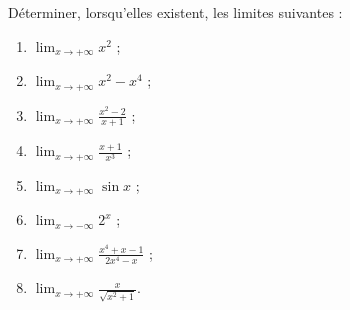 \begin{exercice}[\boringexo]\label{exoTD2B_1}

Déterminer, lorsqu'elles existent, les limites suivantes :
\begin{enumerate}
\item 
  $\displaystyle \lim_{x\to +\infty}x^2$ ;
\item 
  $\displaystyle \lim_{x\to +\infty}x^2-x^4$ ;
\item
  $\displaystyle \lim_{x\to +\infty}\frac{x^2-2}{x+1}$ ;
\item
  $\displaystyle \lim_{x\to +\infty}\frac{x+1}{x^3}$ ;
\item
  $\displaystyle \lim_{x\to +\infty}\sin x$ ;
\item
  $\displaystyle \lim_{x\to -\infty} 2^x$ ;
\item 
  $\displaystyle \lim_{x\to +\infty}\frac{x^4+x-1}{2x^4-x}$ ;
\item
  $\displaystyle \lim_{x\to +\infty}\frac{x}{\sqrt{x^2+1}}$.
\end{enumerate}
\end{exercice}


 
